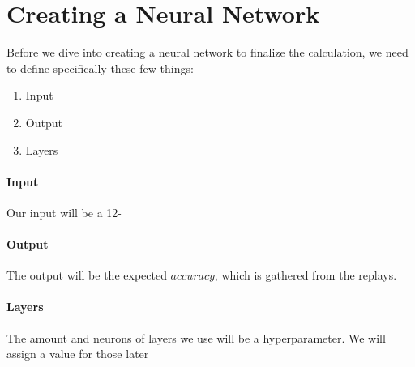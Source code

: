 

\section{Creating a Neural Network}

Before we dive into creating a neural network to finalize the calculation, we need to define specifically these few things:

\begin{enumerate}
	\item Input
	\item Output
	\item Layers
\end{enumerate}

\paragraph{Input} Our input will be a 12-

\paragraph{Output} The output will be the expected $accuracy$, which is gathered from the replays.

\paragraph{Layers} The amount and neurons of layers we use will be a hyperparameter. We will assign a value for those later



